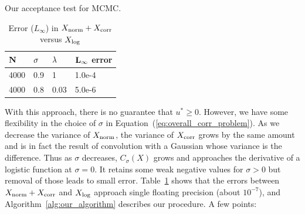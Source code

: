 \documentclass{article}
\begin{document}
\begin{algorithm}[t]
\caption{Our acceptance test for MCMC.}
\label{alg:our_algorithm}
\end{algorithm}

\begin{table}[t]
    \caption{Error ($L_\infty$) in $X_{\rm norm}+X_{\rm corr}$ versus $X_{\rm log}$}
    \label{tab:xcorr}
    \centering
    \begin{tabular}{l l l l} \\
    ${\bf N}$ & ${\bf \sigma}$ & ${\bf \lambda}$ & ${\bf L_{\infty}}$ {\bf error} \\
    \hline
    4000 & 0.9 & 1 & 1.0e-4  \\
    4000 & 0.8 & 0.03 & 5.0e-6
    \end{tabular}
\end{table}

With this approach, there is no guarantee that $u^* \geq 0$. However, we have
some flexibility in the choice of $\sigma$ in Equation~(\ref{eq:overall_corr_problem}).
As we decrease the variance of $X_{\rm norm}$, the variance of $X_{\rm corr}$
grows by the same amount and is in fact the result of convolution with a
Gaussian whose variance is the difference.  Thus as $\sigma$ decreases,
$C_\sigma(X)$ grows and approaches the derivative of a logistic function at
$\sigma = 0$. It retains some weak negative values for $\sigma > 0$ but removal
of those leads to small error. Table~\ref{tab:xcorr} shows that the errors
between $X_{\rm norm}+X_{\rm corr}$ and $X_{\rm log}$ approach single floating
precision (about $10^{-7}$), and Algorithm~\ref{alg:our_algorithm} describes our
procedure. A few points:
\end{document}
